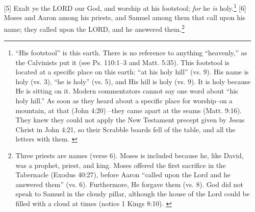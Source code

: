 [5] \textcolor[rgb]{0.00,0.00,1.00}{Exalt ye the LORD our God, and worship at his footstool; \emph{for} he \emph{is} holy.}\footnote{``His footstool'' is this earth. There is no reference to anything ``heavenly,'' as the Calvinists put it (see Ps. 110:1--3 and Matt. 5:35). This footstool is located at a specific place on this earth: ``at his holy hill'' (vs. 9). His name is holy (vs. 3), ``he is holy'' (vs. 5), and His hill is holy (vs. 9). It is holy because He is sitting on it. Modern commentators cannot say one word about ``his holy hill.'' As soon as they heard about a specific place for worship--on a mountain, at that (John 4:20) --they came apart at the seams (Matt. 9:16). They knew they could not apply the New Testament precept given by Jesus Christ in John 4:21, so their Scrabble boards fell of the table, and all the letters with them. \cite{Ruckman1992psalms}}
[6] \textcolor[rgb]{0.00,0.00,1.00}{Moses and Aaron among his priests, and Samuel among them that call upon his name; they called upon the LORD, and he answered them.}\footnote{Three priests are names (verse 6). Moses is included because he, like David, was a prophet, priest, and king. Moses  offered the first sacrifice in the Tabernacle (Exodus 40:27), before Aaron ``called upon the Lord and he answered them'' (vs. 6). Furthermore, He forgave them (vs. 8). God did not speak to Samuel in the cloudy pillar, although the house of the Lord could be filled with a cloud at times (notice 1 Kings 8:10). \cite{Ruckman1992psalms}}
